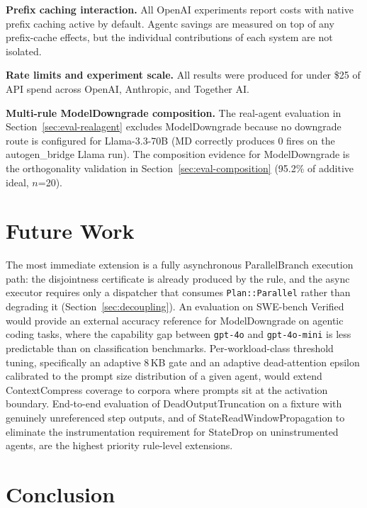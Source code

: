 \documentclass[sigconf,9pt]{acmart}
\begin{document}
\textbf{Prefix caching interaction.} All OpenAI experiments report costs with native
prefix caching active by default. Agentc savings are measured on top of any
prefix-cache effects, but the individual contributions of each system are not isolated.

\textbf{Rate limits and experiment scale.} All results were produced for under \$25 of
API spend across OpenAI, Anthropic, and Together AI.

\textbf{Multi-rule ModelDowngrade composition.} The real-agent evaluation in
Section~\ref{sec:eval-realagent} excludes ModelDowngrade because no downgrade route
is configured for Llama-3.3-70B (MD correctly produces 0 fires on the autogen\_bridge
Llama run). The composition evidence for ModelDowngrade is the orthogonality
validation in Section~\ref{sec:eval-composition} (95.2\% of additive ideal, $n$=20).

\section{Future Work}
\label{sec:futurework}

The most immediate extension is a fully asynchronous ParallelBranch execution path:
the disjointness certificate is already produced by the rule, and the async executor
requires only a dispatcher that consumes \texttt{Plan::Parallel} rather than
degrading it (Section~\ref{sec:decoupling}). An evaluation on SWE-bench
Verified~\cite{jimenez2024swebench} would provide an external accuracy reference for
ModelDowngrade on agentic coding tasks, where the capability gap between
\texttt{gpt-4o} and \texttt{gpt-4o-mini} is less predictable than on classification
benchmarks. Per-workload-class threshold tuning, specifically an adaptive 8\,KB gate
and an adaptive dead-attention epsilon calibrated to the prompt size distribution of
a given agent, would extend ContextCompress coverage to corpora where prompts sit at
the activation boundary. End-to-end evaluation of DeadOutputTruncation on a fixture
with genuinely unreferenced step outputs, and of StateReadWindowPropagation to
eliminate the instrumentation requirement for StateDrop on uninstrumented agents, are
the highest priority rule-level extensions.

\section{Conclusion}
\label{sec:conclusion}
\end{document}
